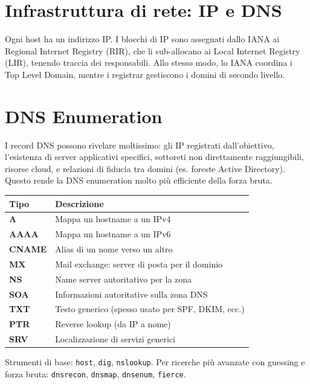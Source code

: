 \documentclass[12pt, a4paper]{report}
\begin{document}
\section{Infrastruttura di rete: IP e DNS}

Ogni host ha un indirizzo IP. I blocchi di IP sono assegnati dallo IANA ai Regional Internet Registry (RIR), che li sub-allocano ai Local Internet Registry (LIR), tenendo traccia dei responsabili. Allo stesso modo, lo IANA coordina i Top Level Domain, mentre i registrar gestiscono i domini di secondo livello.

\section{DNS Enumeration}

I record DNS possono rivelare moltissimo: gli IP registrati dall'obiettivo, l'esistenza di server applicativi specifici, sottoreti non direttamente raggiungibili, risorse cloud, e relazioni di fiducia tra domini (es. foreste Active Directory). Questo rende la DNS enumeration molto più efficiente della forza bruta.

\begin{table}[H]
	\centering
	\begin{tabular}{|l|l|}
		\hline
		\textbf{Tipo} & \textbf{Descrizione} \\ \hline
		\textbf{A} & Mappa un hostname a un IPv4 \\ \hline
		\textbf{AAAA} & Mappa un hostname a un IPv6 \\ \hline
		\textbf{CNAME} & Alias di un nome verso un altro \\ \hline
		\textbf{MX} & Mail exchange: server di posta per il dominio \\ \hline
		\textbf{NS} & Name server autoritativo per la zona \\ \hline
		\textbf{SOA} & Informazioni autoritative sulla zona DNS \\ \hline
		\textbf{TXT} & Testo generico (spesso usato per SPF, DKIM, ecc.) \\ \hline
		\textbf{PTR} & Reverse lookup (da IP a nome) \\ \hline
		\textbf{SRV} & Localizzazione di servizi generici \\ \hline
	\end{tabular}
\end{table}

Strumenti di base: \texttt{host}, \texttt{dig}, \texttt{nslookup}. Per ricerche più avanzate con guessing e forza bruta: \texttt{dnsrecon}, \texttt{dnsmap}, \texttt{dnsenum}, \texttt{fierce}.
\end{document}
